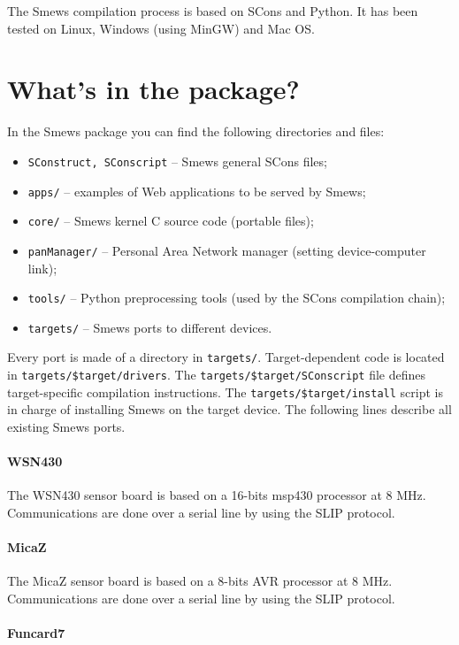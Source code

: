 \documentclass{report}
\begin{document}
The Smews compilation process is based on SCons and Python. It has been tested on Linux, Windows (using MinGW) and Mac OS.

\section{What's in the package?}

In the Smews package you can find the following directories and files:
\begin{itemize}
\item \verb+SConstruct, SConscript+
-- Smews general SCons files;
\item \verb+apps/+
-- examples of Web applications to be served by Smews;
\item \verb+core/+
-- Smews kernel C source code (portable files);
\item \verb+panManager/+
-- Personal Area Network manager (setting device-computer link);
\item \verb+tools/+
-- Python preprocessing tools (used by the SCons compilation chain);
\item \verb+targets/+
-- Smews ports to different devices.
\end{itemize}

Every port is made of a directory in \verb+targets/+. Target-dependent code is located in \verb+targets/$target/drivers+. The \verb+targets/$target/SConscript+ file defines target-specific compilation instructions. The \verb+targets/$target/install+ script is in charge of installing Smews on the target device. The following lines describe all existing Smews ports.

\paragraph{WSN430}

The WSN430 sensor board is based on a 16-bits msp430 processor at 8 MHz. Communications are done over a serial line by using the SLIP protocol.

\paragraph{MicaZ}

The MicaZ sensor board is based on a 8-bits AVR processor at 8 MHz. Communications are done over a serial line by using the SLIP protocol.

\paragraph{Funcard7}
\end{document}
